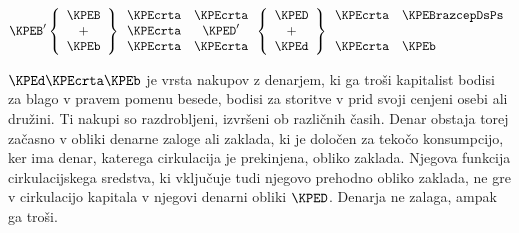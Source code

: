 \documentclass[kapital_02.tex]{subfiles}
\begin{document}
\[
    \KPEB'
    \left\lbrace
    \begin{array}{c}
        \KPEB \\
        \textrm{+} \\
        \KPEb \\
    \end{array}
    \right\rbrace
    \begin{array}{c c}
        \KPEcrta & \KPEcrta \\
        \KPEcrta & \KPED' \\
        \KPEcrta & \KPEcrta \\
    \end{array}
    \left\lbrace
    \begin{array}{c}
        \KPED \\
        \textrm{+} \\
        \KPEd \\
    \end{array}
    \right\rbrace
    \begin{array}{c l}
        \KPEcrta & \KPEBrazcepDsPs \\
         & \\
        \KPEcrta & \KPEb \\
    \end{array}
\]



\( \KPEd \KPEcrta \KPEb \) je vrsta nakupov z denarjem, ki ga troši kapitalist bodisi za blago v pravem pomenu besede, bodisi za storitve v prid svoji cenjeni osebi ali družini. Ti nakupi so razdrobljeni, izvršeni ob različnih časih. Denar obstaja torej začasno v obliki denarne zaloge ali zaklada, ki je določen za tekočo konsumpcijo, ker ima denar, katerega cirkulacija je prekinjena, obliko zaklada. Njegova funkcija cirkulacijskega sredstva, ki vključuje tudi njegovo prehodno obliko zaklada, ne gre v cirkulacijo kapitala v njegovi denarni obliki \( \KPED \). Denarja ne zalaga, ampak ga troši.
\end{document}
